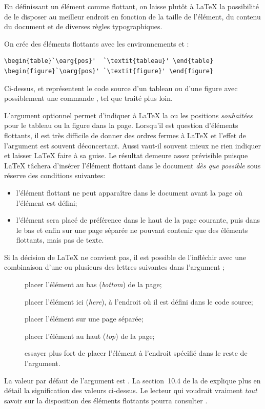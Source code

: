 En définissant un élément comme flottant, on laisse plutôt à
{\LaTeX} la possibilité de le disposer au meilleur endroit en fonction
de la taille de l'élément, du contenu du document et de diverses
règles typographiques.

On crée des éléments flottants avec les environnements 
et :
\begin{lstlisting}
\begin{table}`\oarg{pos}'  `\textit{tableau}' \end{table}
\begin{figure}`\oarg{pos}' `\textit{figure}' \end{figure}
\end{lstlisting}
Ci-dessus,  et  représentent le code source
d'un tableau ou d'une figure avec possiblement une commande
, tel que traité plus loin.

L'argument optionnel  permet d'indiquer à {\LaTeX}
la ou les positions \emph{souhaitées} pour le tableau ou la figure dans la page.
Lorsqu'il est question d'éléments flottants, il est très difficile de donner des
ordres fermes à {\LaTeX} et l'effet de l'argument  est
souvent déconcertant. Aussi vaut-il souvent mieux ne rien indiquer et
laisser {\LaTeX} faire à sa guise. Le résultat demeure assez
prévisible puisque {\LaTeX} tâchera d'insérer l'élément flottant dans
le document \emph{dès que possible} sous réserve des conditions
suivantes:
\begin{itemize}
\item l'élément flottant ne peut apparaître dans le document avant la
  page où l'élément est défini;
\item l'élément sera placé de préférence dans le haut de la page
  courante, puis dans le bas et enfin sur une page séparée ne pouvant
  contenir que des éléments flottants, mais pas de texte.
\end{itemize}

Si la décision de {\LaTeX} ne convient pas, il est possible de
l'infléchir avec une combinaison d'une ou plusieurs des lettres
suivantes dans l'argument ;
\begin{description}
\item[\normalfont{}] placer l'élément au bas (\emph{bottom}) de la page;
\item[\normalfont{}] placer l'élément ici (\emph{here}), à
  l'endroit où il est défini dans le code source;
\item[\normalfont{}] placer l'élément sur une page séparée;
\item[\normalfont{}] placer l'élément au haut (\emph{top}) de la page;
\item[\normalfont\code{!}] essayer plus fort de placer l'élément à
  l'endroit spécifié dans le reste de l'argument.
\end{description}
La valeur par défaut de l'argument  est . La
section~10.4 de la %
de  explique plus en détail la signification des valeurs
ci-dessus. Le lecteur qui voudrait vraiment \emph{tout} savoir sur la
disposition des éléments flottants pourra consulter
\cite{Mittelbach:floats:2014}.

